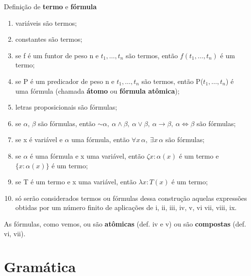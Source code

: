 \bigskip
\noindent Definição de \textbf{termo} e \textbf{fórmula}

\begin{enumerate}[label=\roman*)]
    \item variáveis são termos;
    \item constantes são termos;
    \item se f é um funtor de peso n e $t_1, \dots, t_n$ são termos, então $f(t_1, \dots, t_n)$ é um termo;
    \item se P é um predicador de peso n e $t_1, \dots, t_n$ são termos, então P($t_1, \dots, t_n$) é uma fórmula (chamada \textbf{átomo} ou \textbf{fórmula atômica});
    \item letras proposicionais são fórmulas;
    \item se $\alpha$, $\beta$ são fórmulas, então $\sim \alpha,\ \alpha \land \beta,\ \alpha \lor \beta,\ \alpha \to \beta,\ \alpha \iff \beta$ são fórmulas;
    \item se x é variável e $\alpha$ uma fórmula, então $\forall x \, \alpha,\ \exists x \, \alpha$ são fórmulas;
    \item se $\alpha$ é uma fórmula e x uma variável, então $\zeta x \colon \alpha(x)$ é um termo e $\{ x \colon \alpha(x)\}$ é um termo;
    \item se T é um termo e x uma variável, então $\lambda x \colon T(x)$ é um termo;
    \item só serão considerados termos ou fórmulas dessa construção aquelas expressões obtidas por um número finito de aplicações de i, ii, iii, iv, v, vi vii, viii, ix.
\end{enumerate}

As fórmulas, como vemos, ou são \textbf{atômicas} (def. iv e v) ou são \textbf{compostas} (def. vi, vii).

\section{Gramática}

